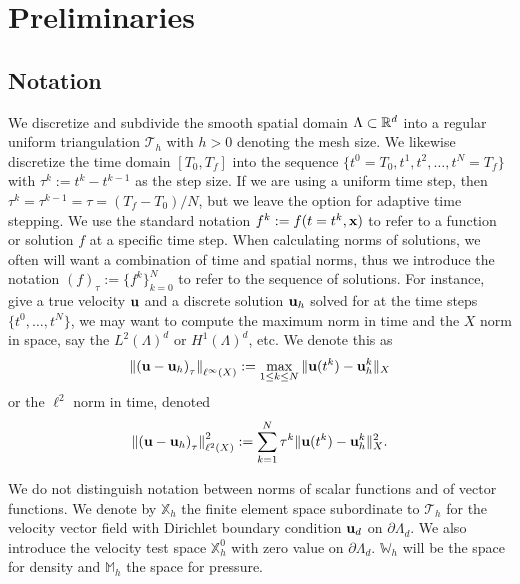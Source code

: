 \documentclass[letterpaper]{erdc}
\begin{document}
%
%
%
\section{Preliminaries}\label{sec:Preliminaries}


%
%
\subsection{Notation}

We discretize and subdivide the smooth spatial domain $\Lambda\subset \mathbb{R}^d$
into a regular uniform triangulation $\mathcal{T}_h$ with $h>0$ denoting the
mesh size.  We likewise discretize the time domain $[T_0,T_f]$ into the
sequence $\{ t^0=T_0, t^1, t^2, \dots, t^N = T_f\}$ with $\tau^k:= t^k-t^{k-1}$
as the step size.  If we are using a uniform time step, then
$\tau^k = \tau^{k-1} = \tau = (T_f-T_0)/N$, but we leave the option for
adaptive time stepping.  We use the standard notation $f^{k} := f(t=t^k,\textbf{x})$ to
refer to a function or solution $f$ at a specific time step.  When calculating
norms of solutions, we often will want a combination of time and spatial norms,
thus we introduce the notation $\left( f \right)_{\tau}:= \{ f^k \}_{k=0}^{N}$
to refer to the sequence of solutions.  For instance, give a true velocity
$\textbf{u}$ and a discrete solution $\textbf{u}_h$ solved for at the time steps
$\{t^0,\dots, t^{N}\}$, we may want to compute the maximum norm in time and the
$X$ norm in space, say the $L^2(\Lambda)^d$ or $H^1(\Lambda)^d$, etc.  We
denote this as
\begin{equation}
  \left\| \left( \textbf{u} - \textbf{u}_h \right)_{\tau} \right\|_{\ell^{\infty}(X)} := \max_{1\leq k \leq N} \| \textbf{u}(t^{k}) - \textbf{u}_h^{k}\|_{X}
\end{equation}
or the $\ell^2$ norm in time, denoted
\begin{equation}
  \left\| \left( \textbf{u} - \textbf{u}_h \right)_{\tau} \right\|^2_{\ell^{2}(X)} :=  \sum_{k=1}^{N} \tau^{k}\| \textbf{u}(t^{k}) - \textbf{u}_h^{k}\|^2_{X}.
\end{equation}

We do not distinguish notation between norms of scalar functions and of vector
functions.  We denote by $\mathbb{X}_h$ the finite element space subordinate to
$\mathcal{T}_h$ for the velocity vector field with Dirichlet boundary condition
$\textbf{u}_d$ on $\partial\Lambda_{d}$.  We also introduce the velocity test space
$\mathbb{X}_h^0$ with zero value on $\partial\Lambda_d$.  $\mathbb{W}_h$ will
be the space for density and $\mathbb{M}_h$ the space for pressure.
\end{document}
